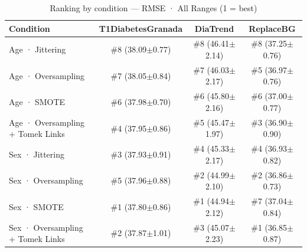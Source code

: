 \begin{table}[htbp]
\centering
\small
\caption{Ranking by condition — RMSE · All Ranges  (1 = best)}
\label{tab:ranking_rmse_entire_family_size_oversampling}
\begin{tabular}{lccc}
\toprule
\textbf{Condition} & \textbf{T1DiabetesGranada} & \textbf{DiaTrend} & \textbf{ReplaceBG} \\
\midrule
Age · Jittering & \#8 (38.09$\pm$0.77) & \#8 (46.41$\pm$2.14) & \#8 (37.25$\pm$0.76) \\
Age · Oversampling & \#7 (38.05$\pm$0.84) & \#7 (46.03$\pm$2.17) & \#5 (36.97$\pm$0.76) \\
Age · SMOTE & \#6 (37.98$\pm$0.70) & \#6 (45.80$\pm$2.16) & \#6 (37.00$\pm$0.77) \\
Age · Oversampling + Tomek Links & \#4 (37.95$\pm$0.86) & \#5 (45.47$\pm$1.97) & \#3 (36.90$\pm$0.90) \\
\midrule
Sex · Jittering & \#3 (37.93$\pm$0.91) & \#4 (45.33$\pm$2.17) & \#4 (36.93$\pm$0.82) \\
Sex · Oversampling & \#5 (37.96$\pm$0.88) & \#2 (44.99$\pm$2.10) & \#2 (36.86$\pm$0.73) \\
Sex · SMOTE & \#1 (37.80$\pm$0.86) & \#1 (44.94$\pm$2.12) & \#7 (37.04$\pm$0.84) \\
Sex · Oversampling + Tomek Links & \#2 (37.87$\pm$1.01) & \#3 (45.07$\pm$2.23) & \#1 (36.85$\pm$0.87) \\
\bottomrule
\end{tabular}
\end{table}